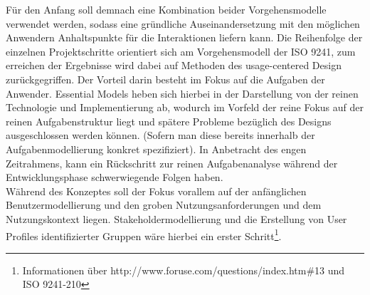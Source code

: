 Für den Anfang soll demnach eine Kombination beider Vorgehensmodelle verwendet werden, sodass eine gründliche Auseinandersetzung mit den möglichen Anwendern Anhaltspunkte für die Interaktionen liefern kann. Die Reihenfolge der einzelnen Projektschritte orientiert sich am Vorgehensmodell der ISO 9241, zum erreichen der Ergebnisse wird dabei auf Methoden des usage-centered Design zurückgegriffen. Der Vorteil darin besteht im Fokus auf die Aufgaben der Anwender. Essential Models heben sich hierbei in der Darstellung von der reinen Technologie und Implementierung ab, wodurch im Vorfeld der reine Fokus auf der reinen Aufgabenstruktur liegt und spätere Probleme bezüglich des Designs ausgeschlossen werden können. (Sofern man diese bereits innerhalb der Aufgabenmodellierung konkret spezifiziert). In Anbetracht des engen Zeitrahmens, kann ein Rückschritt zur reinen Aufgabenanalyse während der Entwicklungsphase schwerwiegende Folgen haben.\\

Während des Konzeptes soll der Fokus vorallem auf der anfänglichen Benutzermodellierung und den groben Nutzungsanforderungen und dem Nutzungskontext liegen.
Stakeholdermodellierung und die Erstellung von User Profiles identifizierter Gruppen wäre hierbei ein erster Schritt\footnote{Informationen über http://www.foruse.com/questions/index.htm\#13 und ISO 9241-210}. 





\newpage



\newpage



\newpage



\newpage



\newpage
